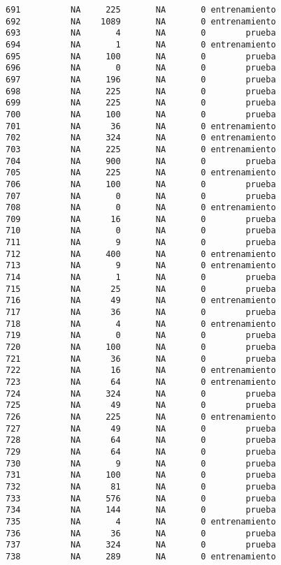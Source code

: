 \documentclass[
  letterpaper,
  DIV=11,
  numbers=noendperiod]{scrreprt}
\begin{document}
\begin{verbatim}
691          NA     225       NA       0 entrenamiento
692          NA    1089       NA       0 entrenamiento
693          NA       4       NA       0        prueba
694          NA       1       NA       0 entrenamiento
695          NA     100       NA       0        prueba
696          NA       0       NA       0        prueba
697          NA     196       NA       0        prueba
698          NA     225       NA       0        prueba
699          NA     225       NA       0        prueba
700          NA     100       NA       0        prueba
701          NA      36       NA       0 entrenamiento
702          NA     324       NA       0 entrenamiento
703          NA     225       NA       0 entrenamiento
704          NA     900       NA       0        prueba
705          NA     225       NA       0 entrenamiento
706          NA     100       NA       0        prueba
707          NA       0       NA       0        prueba
708          NA       0       NA       0 entrenamiento
709          NA      16       NA       0        prueba
710          NA       0       NA       0        prueba
711          NA       9       NA       0        prueba
712          NA     400       NA       0 entrenamiento
713          NA       9       NA       0 entrenamiento
714          NA       1       NA       0        prueba
715          NA      25       NA       0        prueba
716          NA      49       NA       0 entrenamiento
717          NA      36       NA       0        prueba
718          NA       4       NA       0 entrenamiento
719          NA       0       NA       0        prueba
720          NA     100       NA       0        prueba
721          NA      36       NA       0        prueba
722          NA      16       NA       0 entrenamiento
723          NA      64       NA       0 entrenamiento
724          NA     324       NA       0        prueba
725          NA      49       NA       0        prueba
726          NA     225       NA       0 entrenamiento
727          NA      49       NA       0        prueba
728          NA      64       NA       0        prueba
729          NA      64       NA       0        prueba
730          NA       9       NA       0        prueba
731          NA     100       NA       0        prueba
732          NA      81       NA       0        prueba
733          NA     576       NA       0        prueba
734          NA     144       NA       0        prueba
735          NA       4       NA       0 entrenamiento
736          NA      36       NA       0        prueba
737          NA     324       NA       0        prueba
738          NA     289       NA       0 entrenamiento

\end{verbatim}
\end{document}

